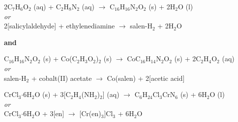 

\newcommand{\super}[1]{\ensuremath{^{\textrm{#1}}}}
\newcommand{\sub}[1]{\ensuremath{_{\textrm{#1}}}}

\begin{center}
  2C\sub{7}H\sub{6}O\sub{2} (aq) + C\sub{2}H\sub{8}N\sub{2} (aq) $\rightarrow$ C\sub{16}H\sub{16}N\sub{2}O\sub{2} (s) + 2H\sub{2}O (l) \\
    \textit{or} \\
  2[salicylaldehyde] + ethylenediamine $\rightarrow$ salen-H\sub{2} + 2H\sub{2}O \bigskip

    \textbf{and} \bigskip

  C\sub{16}H\sub{16}N\sub{2}O\sub{2} (s) + Co(C\sub{2}H\sub{3}O\sub{2})\sub{2} (s) $\rightarrow$ CoC\sub{16}H\sub{14}N\sub{2}O\sub{2} (s) + 2C\sub{2}H\sub{4}O\sub{2} (aq) \\
    \textit{or} \\
  salen-H\sub{2} + cobalt(II) acetate $\rightarrow$ Co(salen) + 2[acetic acid]
\end{center}


\begin{center}
  CrCl\sub{3}$\cdot$6H\sub{2}O (s) + 3[C\sub{2}H\sub{4}(NH\sub{2})\sub{2}] (aq) $\rightarrow$ C\sub{6}H\sub{24}Cl\sub{3}CrN\sub{6} (s) + 6H\sub{2}O (l)\\
    \textit{or} \\
  CrCl\sub{3}$\cdot$6H\sub{2}O + 3[en] $\rightarrow$ [Cr(en)\sub{3}]Cl\sub{3} + 6H\sub{2}O
\end{center}


